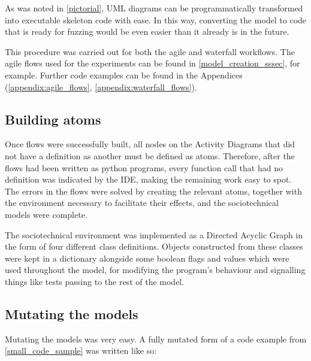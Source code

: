 As was noted in \cref{pictorial}, UML diagrams can be programmatically transformed into executable skeleton code with ease. In this way, converting the model to code that is ready for fuzzing would be even easier than it already is in the future. \par

This procedure was carried out for both the agile and waterfall workflows. The agile flows used for the experiments can be found in \cref{model_creation_sssec}, for example. Further code examples can be found in the Appendices (\cref{appendix:agile_flows}, \cref{appendix:waterfall_flows}). \par

\subsection{Building atoms}
Once flows were successfully built, all nodes on the Activity Diagrams that did not have a definition as another must be defined as atoms. Therefore, after the flows had been written as python programs, every function call that had no definition was indicated by the IDE, making the remaining work easy to spot. The errors in the flows were solved by creating the relevant atoms, together with the environment necessary to facilitate their effects, and the sociotechnical models were complete. \par

The sociotechnical environment was implemented as a Directed Acyclic Graph in the form of four different class definitions. Objects constructed from these classes were kept in a dictionary alongside some boolean flags and values which were used throughout the model, for modifying the program's behaviour and signalling things like tests passing to the rest of the model. \par

\subsection{Mutating the models}
Mutating the models was very easy. A fully mutated form of a code example from \cref{small_code_sample} was written like so:

